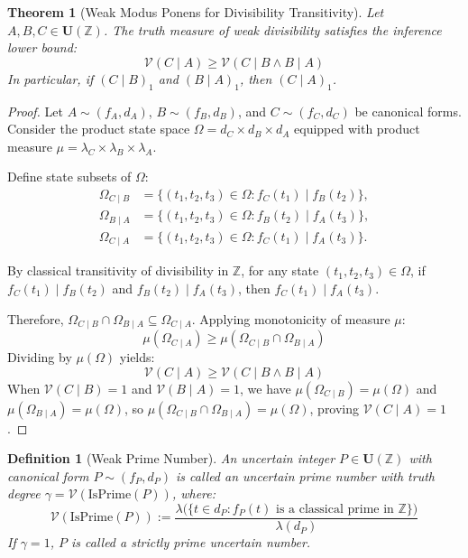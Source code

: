 \documentclass[a4paper,14pt, twoside]{memoir}
\newtheorem{definition}{Definition}[chapter]
\newtheorem{theorem}{Theorem}[chapter]
\newcommand{\tsbd}[1]{\mathbf{U}(\mathbb{#1})}
\newcommand{\ddclmd}{\mathcal{V}} %
\begin{document}
	\begin{theorem}[Weak Modus Ponens for Divisibility Transitivity]
		Let $A, B, C \in \tsbd{Z}$. The truth measure of weak divisibility satisfies the inference lower bound:
		\[
		\ddclmd(C \mid A) \ge \ddclmd(C \mid B \land B \mid A)
		\]
		In particular, if $(C \mid B)_1$ and $(B \mid A)_1$, then $(C \mid A)_1$.
	\end{theorem}
	
	\begin{proof}
		Let $A \sim (f_A, d_A)$, $B \sim (f_B, d_B)$, and $C \sim (f_C, d_C)$ be canonical forms. Consider the product state space $\Omega = d_C \times d_B \times d_A$ equipped with product measure $\mu = \lambda_C \times \lambda_B \times \lambda_A$.
		
		Define state subsets of $\Omega$:
		\begin{align*}
			\Omega_{C \mid B} &= \{(t_1, t_2, t_3) \in \Omega : f_C(t_1) \mid f_B(t_2)\}, \\
			\Omega_{B \mid A} &= \{(t_1, t_2, t_3) \in \Omega : f_B(t_2) \mid f_A(t_3)\}, \\
			\Omega_{C \mid A} &= \{(t_1, t_2, t_3) \in \Omega : f_C(t_1) \mid f_A(t_3)\}.
		\end{align*}
		
		By classical transitivity of divisibility in $\mathbb{Z}$, for any state $(t_1, t_2, t_3) \in \Omega$, if $f_C(t_1) \mid f_B(t_2)$ and $f_B(t_2) \mid f_A(t_3)$, then $f_C(t_1) \mid f_A(t_3)$.
		
		Therefore, $\Omega_{C \mid B} \cap \Omega_{B \mid A} \subseteq \Omega_{C \mid A}$. Applying monotonicity of measure $\mu$:
		\[
		\mu(\Omega_{C \mid A}) \ge \mu(\Omega_{C \mid B} \cap \Omega_{B \mid A})
		\]
		Dividing by $\mu(\Omega)$ yields:
		\[
		\ddclmd(C \mid A) \ge \ddclmd(C \mid B \land B \mid A)
		\]
		When $\ddclmd(C \mid B) = 1$ and $\ddclmd(B \mid A) = 1$, we have $\mu(\Omega_{C \mid B}) = \mu(\Omega)$ and $\mu(\Omega_{B \mid A}) = \mu(\Omega)$, so $\mu(\Omega_{C \mid B} \cap \Omega_{B \mid A}) = \mu(\Omega)$, proving $\ddclmd(C \mid A) = 1$.
	\end{proof}
	
	\begin{definition}[Weak Prime Number]
		An uncertain integer $P \in \tsbd{Z}$ with canonical form $P \sim (f_P, d_P)$ is called an uncertain prime number with truth degree $\gamma = \ddclmd(\text{IsPrime}(P))$, where:
		\[
		\ddclmd(\text{IsPrime}(P)) := \frac{\lambda\big(\{t \in d_P : f_P(t) \text{ is a classical prime in } \mathbb{Z}\}\big)}{\lambda(d_P)}
		\]
		If $\gamma = 1$, $P$ is called a strictly prime uncertain number.
	\end{definition}
	
\end{document}
